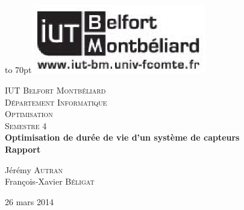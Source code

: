 \documentclass[12pt]{report}
\begin{document}
{
\begin{titlepage}

\vbox to 70pt{\hfill\includegraphics[height=3cm]{images/logo-iut.eps}}\
\begin{center}

\textsc{\LARGE IUT Belfort Montbéliard}\\[0.7cm]
\textsc{\LARGE Département Informatique}\\[1.0cm]
\textsc{\Large Optimisation}\\[0.5cm]
\textsc{\Large Semestre 4}\\[5cm]


{ \huge \bfseries Optimisation de durée de vie d'un système de capteurs}\\[0.5cm]
{ \huge \bfseries Rapport}\\[3cm]

\begin{large}
Jérémy \textsc{Autran}\\[0.3em]
François-Xavier \textsc{Béligat}\\[0.3em]

\end{large}

\vfill

{\large 26 mars 2014}

\end{center}
\end{titlepage}
}

{\clearpage\mbox{}\thispagestyle{empty}\clearpage}
\setcounter{page}{1}





\end{document}
